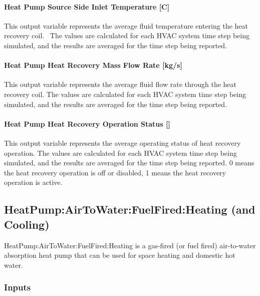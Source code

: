 \paragraph{Heat Pump Source Side Inlet Temperature {[}C{]}}\label{air-to-water-heat-pump-source-side-inlet-temperature-c}

This output variable represents the average fluid temperature entering the heat recovery coil.~ The values are calculated for each HVAC system time step being simulated, and the results are averaged for the time step being reported.

\paragraph{Heat Pump Heat Recovery Mass Flow Rate {[}kg/s{]}}\label{air-to-water-heat-pump-heat-recovery-mass-flow-rate-kgs}

This output variable represents the average fluid flow rate through the heat recovery coil. The values are calculated for each HVAC system time step being simulated, and the results are averaged for the time step being reported.

\paragraph{Heat Pump Heat Recovery Operation Status {[}{]}}\label{air-to-water-heat-pump-heat-recovery-operating-status}

This output variable represents the average operating status of heat recovery operation. The values are calculated for each HVAC system time step being simulated, and the results are averaged for the time step being reported. 0 means the heat recovery operation is off or disabled, 1 means the heat recovery operation is active.


\subsection{HeatPump:AirToWater:FuelFired:Heating (and Cooling)}\label{plhp_fuelfired}

HeatPump:AirToWater:FuelFired:Heating is a gas-fired (or fuel fired) air-to-water absorption heat pump that can be used for space heating and domestic hot water. 

\subsubsection{Inputs}

